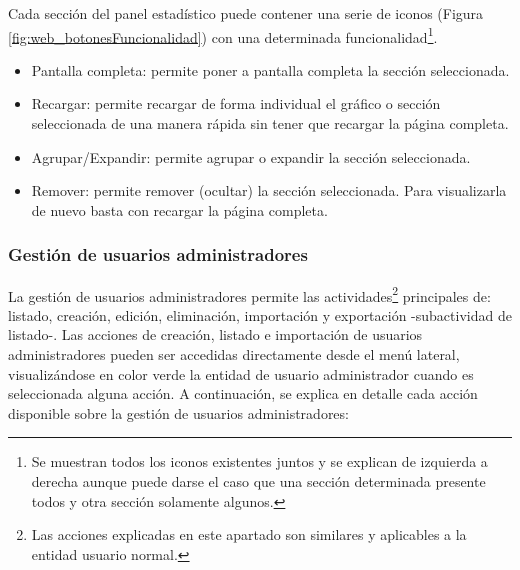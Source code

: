 \documentclass[12pt,a4paper, twoside]{report}
\begin{document}
	Cada sección del panel estadístico puede contener una serie de iconos (Figura \ref{fig:web_botonesFuncionalidad}) con una determinada funcionalidad\footnote{Se muestran todos los iconos existentes juntos y se explican de izquierda a derecha aunque puede darse el caso que una sección determinada presente todos y otra sección solamente algunos.}.
	
	\begin{itemize}
		\item Pantalla completa: permite poner a pantalla completa la sección seleccionada.
		\item Recargar: permite recargar de forma individual el gráfico o sección seleccionada de una manera rápida sin tener que recargar la página completa.
		\item Agrupar/Expandir: permite agrupar o expandir la sección seleccionada.
		\item Remover: permite remover (ocultar) la sección seleccionada. Para visualizarla de nuevo basta con recargar la página completa.
	\end{itemize}
		
			

	\subsubsection{Gestión de usuarios administradores}
	
	La gestión de usuarios administradores permite las actividades\footnote{Las acciones explicadas en este apartado son similares y aplicables a la entidad usuario normal.} principales de: listado, creación, edición, eliminación, importación y exportación -subactividad de listado-. Las acciones de creación, listado e importación de usuarios administradores pueden ser accedidas directamente desde el menú lateral, visualizándose en color verde la entidad de usuario administrador cuando es seleccionada alguna acción. A continuación, se explica en detalle cada acción disponible sobre la gestión de usuarios administradores:
	
\end{document}
